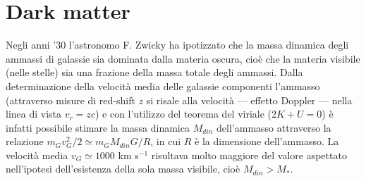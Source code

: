 %

\section{Dark matter}

Negli anni '30 l'astronomo F. Zwicky ha ipotizzato che la massa dinamica degli
ammassi di galassie sia dominata dalla materia oscura, cioè che la materia
visibile (nelle stelle) sia una frazione della massa totale degli ammassi.
Dalla determinazione della velocità media delle galassie componenti l'ammasso
(attraverso misure di red-shift $z$ si risale alla velocità --- effetto Doppler
--- nella linea di vista $v_r = z c$) e con l'utilizzo del teorema del viriale
($2K+U=0$) è infatti possibile stimare la massa dinamica $M_{din}$ dell'ammasso
attraverso la relazione $m_{G} v^2_{G}/2 \simeq m_{G} M_{din} G / R$, in cui $R$
è la dimensione dell'ammasso. La velocità media $v_{G} \simeq 1000$ km s$^{-1}$
risultava molto maggiore del valore aspettato nell'ipotesi dell'esistenza della
sola massa visibile, cioè $M_{din} > M_*$.

